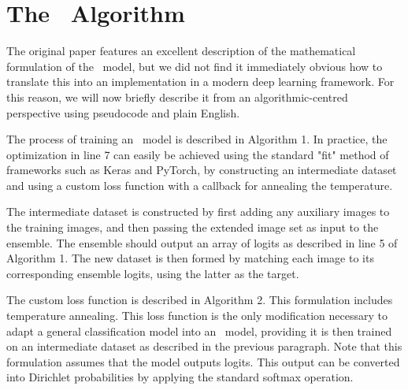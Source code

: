 



\section{The \EnDD \ Algorithm}
\label{sec:the-endd-algorithm}

The original paper features an excellent description of the mathematical formulation of the \EnDD \ model, but we did not find it immediately obvious how to translate this into an implementation in a modern deep learning framework. For this reason, we will now briefly describe it from an algorithmic-centred perspective using pseudocode and plain English.  

The process of training an \EnDD \ model is described in Algorithm 1. In practice, the optimization in line 7 can easily be achieved using the standard "fit" method of frameworks such as Keras and PyTorch, by constructing an intermediate dataset and using a custom loss function with a callback for annealing the temperature. 

The intermediate dataset is constructed by first adding any auxiliary images to the training images, and then passing the extended image set as input to the ensemble. The ensemble should output an array of logits as described in line 5 of Algorithm 1. The new dataset is then formed by matching each image to its corresponding ensemble logits, using the latter as the target. 

The custom loss function is described in Algorithm 2. This formulation includes temperature annealing. This loss function is the only modification necessary to adapt a general classification model into an \EnDD \ model, providing it is then trained on an intermediate dataset as described in the previous paragraph. Note that this formulation assumes that the model outputs logits. This output can be converted into Dirichlet probabilities by applying the standard softmax operation.  


